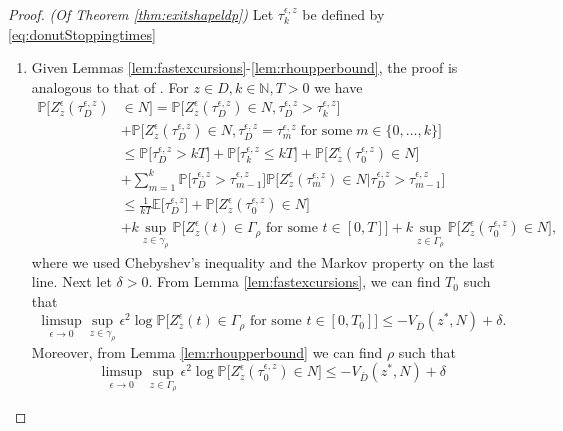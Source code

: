 \documentclass[10pt, reqno]{amsart}
\newcommand{\N}{\mathbb{N}}
\newcommand{\pr}{\mathbb{P}}
\newcommand{\ex}{\mathbb{E}}
\theoremstyle{definition}
\numberwithin{lem}{section}
\numberwithin{cor}{section}
\numberwithin{prop}{section}
\numberwithin{thm}{section}
\numberwithin{dfn}{section}
\begin{document}
\begin{proof}{\textit{(Of Theorem \ref{thm:exitshapeldp})}}
Let $\tau^{\epsilon,z}_k$ be defined by \eqref{eq:donutStoppingtimes}
\begin{enumerate}
       \item Given Lemmas \ref{lem:fastexcursions}-\ref{lem:rhoupperbound}, the proof is analogous to that of \cite[Theorem 5.7.11(b)]{dembo2009large}. For $z\in D, k\in\N, T>0$ we have 
\begin{equation}\label{eq:exitshapemainestimates}
    \begin{aligned}
        \pr\bigg[  Z^\epsilon_z(\tau_D^{\epsilon, z})&\in N   \bigg]= \pr\bigg[  Z^\epsilon_z(\tau_D^{\epsilon, z})\in N, \tau_D^{\epsilon, z}>\tau^{\epsilon, z}_k\bigg]\\&+\pr\bigg[  Z^\epsilon_z(\tau_D^{\epsilon, z})\in N, \tau_D^{\epsilon, z}=\tau_{m}^{\epsilon, z}
        \;\text{for some}\;m\in\{0,\dots, k
        \}\bigg]\\&
        \leq \pr\bigg[ \tau_D^{\epsilon, z}>k T\bigg]+\pr\bigg[ \tau_k^{\epsilon, z}\leq k T \bigg]+\pr\bigg[ Z^\epsilon_z(\tau_{0}^{\epsilon, z})\in N   \bigg]\\&+\sum_{m=1}^{k}\pr\big[\tau_D^{\epsilon, z}> \tau^{\epsilon, z}_{m-1}    \big]\pr\bigg[ Z^\epsilon_z(\tau_{m}^{\epsilon, z})\in N  \bigg|\tau_D^{\epsilon, z}> \tau^{\epsilon, z}_{m-1}    \bigg]\\&
        \leq \frac{1}{kT}\ex\big[ \tau_D^{\epsilon, z}\big]+ \pr\bigg[ Z^\epsilon_z(\tau_{0}^{\epsilon, z})\in N \bigg]\\&+k\sup_{z\in\gamma_{\rho}}\pr\bigg[ Z^{\epsilon}_z(t) \in \Gamma_\rho \text{ for some } t \in [0,T]   \bigg]+k\sup_{z\in\Gamma_\rho}\pr\bigg[Z^\epsilon_z(\tau_{0}^{\epsilon, z})\in N   \bigg],
    \end{aligned}
\end{equation}
where we used Chebyshev's inequality and the Markov property on the last line.
Next let $\delta>0.$ From Lemma \ref{lem:fastexcursions}, we can find $T_0$ such that
\begin{equation*}
        \limsup_{\epsilon \to 0} \sup_{z \in \gamma_\rho} \epsilon^2 \log \pr\bigg[Z^{\epsilon}_z(t) \in \Gamma_\rho \text{ for some } t \in [0,T_0] \bigg]\leq -V_{\bar{D}}( z^*,N)+\delta.
    \end{equation*}
    Moreover, from Lemma \ref{lem:rhoupperbound} we can find $\rho$ such that 
    \begin{equation*}
        \limsup_{\epsilon \to 0} \sup_{z \in \Gamma_\rho} \epsilon^2 \log \pr\bigg[Z^\epsilon_z(\tau^{\epsilon,z}_0) \in N\bigg] \leq - V_{\bar{D}}(z^*,N)+\delta

\end{equation*}
\end{enumerate}
\end{proof}
\end{document}

